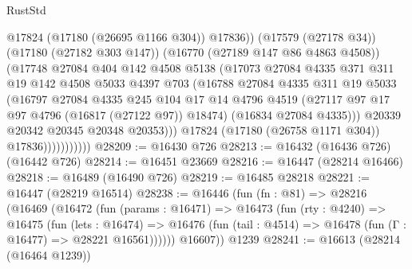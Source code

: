 \begin{lexlean}{RustStd}
\begin{coremodule}
{\begin{coremodule}
{{{{{{{{{{{{{{{{{{{{{{{{{{{{{{{{{{{{{{{{{{{{{{{{{{{{{{{                                @17824
                                (@17180 (@26695 @1166 @304))
                                @17836))
                            (@17579 (@27178 @34))
                            (@17180 (@27182 @303 @147))
                            (@16770 (@27189 @147 @86 @4863 @4508))
                            (@17748
                              @27084
                              @404
                              @142
                              @4508
                              @5138
                              (@17073
                                @27084
                                @4335
                                @371
                                @311
                                @19
                                @142
                                @4508
                                @5033
                                @4397
                                @703
                                (@16788
                                  @27084
                                  @4335
                                  @311
                                  @19
                                  @5033
                                  (@16797
                                    @27084
                                    @4335
                                    @245
                                    @104
                                    @17
                                    @14
                                    @4796
                                    @4519
                                    (@27117 @97 @17 @97 @4796 (@16817 (@27122 @97)) @18474)
                                    (@16834 @27084 @4335)))
                                @20339
                                @20342
                                @20345
                                @20348
                                @20353)))
                          @17824
                          (@17180 (@26758 @1171 @304))
                          @17836)))))))))))
@28209 := @16430 @726
@28213 := @16432 (@16436 @726) (@16442 @726)
@28214 := @16451 @23669
@28216 := @16447 (@28214 @16466)
@28218 := @16489 (@16490 @726)
@28219 := @16485 @28218
@28221 := @16447 (@28219 @16514)
@28238 := @16446
    (fun (fn : @81) =>
    @28216
      (@16469
        (@16472
          (fun (params : @16471) =>
          @16473
            (fun (rty : @4240) =>
            @16475
              (fun (lets : @16474) =>
              @16476 (fun (tail : @4514) => @16478 (fun (Γ : @16477) => @28221 @16561))))))
        @16607))
    @1239
@28241 := @16613 (@28214 (@16464 @1239))
}}}}}}}}}}}}}}}}}}}}}}}}}}}}}}}}}}}}}}}}}}}}}}}}}}}}}}}
\end{coremodule}}
\end{coremodule}
\end{lexlean}
